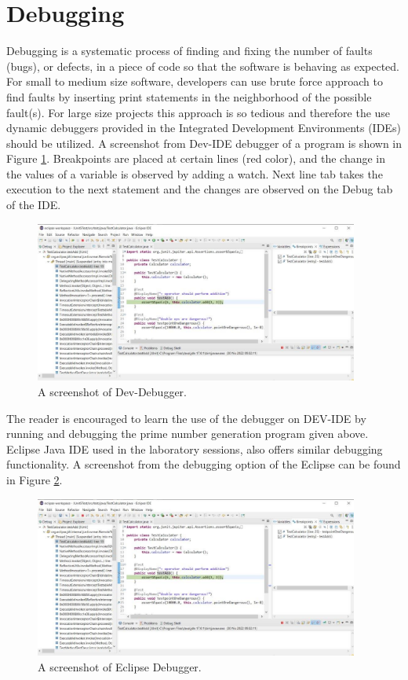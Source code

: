 \section{Debugging}
Debugging is a systematic process of finding and fixing the number of faults (bugs), or defects, in a piece of code so that the software is behaving as expected. For small to medium size software, developers can use brute force approach to find faults by inserting print statements in the neighborhood of the possible fault(s). For large size projects this approach is so tedious and therefore the use dynamic debuggers provided in the Integrated Development Environments (IDEs) should be utilized. A screenshot from Dev-\CC IDE debugger of a program is shown in Figure \ref{fig:devcpp-debugger}. Breakpoints are placed at certain lines (red color), and the change in the values of a variable is observed by adding a watch. Next line tab takes the execution to the next statement and the changes are observed on the Debug tab of the IDE.

\begin{figure}[H]
    \centering
    \includegraphics[width=0.95\textwidth]{images/eclipse-debugger-screenshot.jpg}
    \caption{A screenshot of Dev-\CC Debugger.}
    \label{fig:devcpp-debugger}
\end{figure}
 
The reader is encouraged to learn the use of the debugger on DEV-\CC IDE by running and debugging the prime number generation program given above. Eclipse Java IDE used in the laboratory sessions, also offers similar debugging functionality. A screenshot from the debugging option of the Eclipse can be found in Figure \ref{fig:eclipse-debugger}.

\begin{figure}[H]
    \centering
    \includegraphics[width=0.95\textwidth]{images/eclipse-debugger-screenshot.jpg}
    \caption{A screenshot of Eclipse Debugger.}
    \label{fig:eclipse-debugger}
\end{figure}

